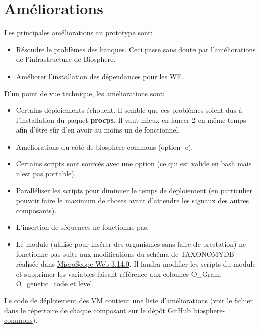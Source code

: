 \section{Améliorations}

Les principales améliorations au prototype sont:
\begin{itemize}
    \item Résoudre le problèmes des banques.
          Ceci passe sans doute par l'améliorations de l'infrastructure de Biosphere.
    \item Améliorer l'installation des dépendances pour les WF.
\end{itemize}
\bigskip

\bigskip

D'un point de vue technique, les améliorations sont:
\begin{itemize}
    \item Certains déploiements échouent.
          Il semble que ces problèmes soient dus à l'installation du paquet \textbf{procps}.
          Il vaut mieux en lancer 2 en même temps afin d'être sûr d'en avoir au moins un de fonctionnel.
    \item Améliorations du côté de biosphère-commons (option -e).
    \item Certains scripts sont sourcés avec une option (ce qui est valide en bash mais n'est pas portable).
    \item Paralléliser les scripts pour diminuer le temps de déploiement (en particulier pouvoir faire le maximum de choses avant d'attendre les signaux des autres composants).
    \item L'insertion de séquences ne fonctionne pas.
    \item Le module  (utilisé pour insérer des organismes sans faire de prestation) ne fonctionne pas suite aux modifications du schéma de TAXONOMYDB réalisée dans \href{https://intranet.genoscope.cns.fr/agc/redmine/versions/142}{MicroScope Web 3.14.0}.
          Il faudra modifier les scripts du module et supprimer les variables faisant référence aux colonnes O\_Gram, O\_genetic\_code et level.
\end{itemize}

Le code de déploiement des VM contient une liste d'améliorations (voir le fichier  dans le répertoire de chaque composant sur le dépôt \href{https://github.com/IFB-ElixirFr/biosphere-commons}{GitHub biosphere-commons}).
